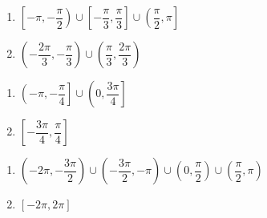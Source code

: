 \begin{multicols}{2}

\begin{enumerate}

\setcounter{enumi}{\value{HW}}

\item $\left[ -\pi, -\dfrac{\pi}{2} \right) \cup \left[ -\dfrac{\pi}{3}, \dfrac{\pi}{3} \right] \cup \left( \dfrac{\pi}{2}, \pi \right]$ 
\item $\left( -\dfrac{2\pi}{3}, -\dfrac{\pi}{3} \right) \cup \left( \dfrac{\pi}{3}, \dfrac{2\pi}{3} \right)$

\setcounter{HW}{\value{enumi}}

\end{enumerate}

\end{multicols}

\begin{multicols}{2}

\begin{enumerate}

\setcounter{enumi}{\value{HW}}

\item $\left( -\pi, -\dfrac{\pi}{4} \right] \cup \left( 0, \dfrac{3\pi}{4} \right]$
\item $\left[ -\dfrac{3\pi}{4}, \dfrac{\pi}{4} \right]$

\setcounter{HW}{\value{enumi}}

\end{enumerate}

\end{multicols}

\begin{multicols}{2}

\begin{enumerate}

\setcounter{enumi}{\value{HW}}

\item \small $\left( -2\pi, -\dfrac{3\pi}{2} \right) \cup \left( -\dfrac{3\pi}{2}, -\pi \right) \cup \left( 0, \dfrac{\pi}{2} \right) \cup \left( \dfrac{\pi}{2}, \pi \right)$ \normalsize
\item  $[-2\pi, 2\pi]$ 

\setcounter{HW}{\value{enumi}}

\end{enumerate}

\end{multicols}

